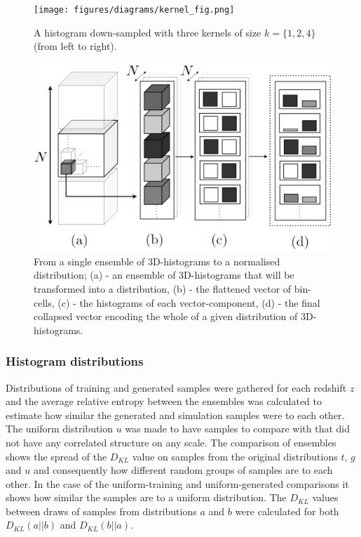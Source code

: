 \documentclass[twocolumn]{article}
\numberwithin{equation}{section}
\begin{document}
\begin{figure}[!ht]%
\texttt{[image: figures/diagrams/kernel\_fig.png]}
\centering
\caption{A histogram down-sampled with three kernels of size $k=\{1, 2, 4\}$ (from left to right).}
\label{fig:kernel_fig}
\end{figure}

\begin{figure}
\includegraphics[width=\columnwidth]{figures/diagrams/kl_stat_process3.png}
\centering
\caption{From a single ensemble of 3D-histograms to a normalised distribution; 
         (a) - an ensemble of 3D-histograms that will be transformed into a distribution, 
         (b) - the flattened vector of bin-cells, 
         (c) - the histograms of each vector-component, 
         (d) - the final collapsed vector encoding the whole of a given distribution of 3D-histograms.}
\label{fig:klstat}
\end{figure}


\subsubsection{Histogram distributions}
Distributions of training and generated samples were gathered for each redshift $z$ and the average relative entropy 
between the ensembles was calculated to estimate how similar the generated and simulation samples were to each other.
The uniform distribution $u$ was made to have samples to compare with that did not have any correlated structure on any 
scale. The comparison of ensembles shows the spread of the $D_{KL}$ value on samples from the original distributions $t$, 
$g$ and $u$ and consequently how different random groups of samples are to each other. In the case of the uniform-training 
and uniform-generated comparisons it shows how similar the samples are to a uniform distribution. The $D_{KL}$ values 
between draws of samples from distributions $a$ and $b$ were calculated for both $D_{KL}(a||b)$ and $D_{KL}(b||a)$. 
\end{document}
